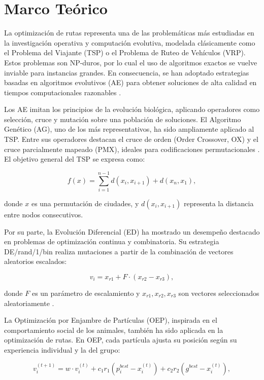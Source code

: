 \documentclass[conference]{IEEEtran}
\begin{document}
\section{Marco Teórico}

La optimización de rutas representa una de las problemáticas más estudiadas en la investigación operativa y computación evolutiva, modelada clásicamente como el Problema del Viajante (TSP) o el Problema de Ruteo de Vehículos (VRP). Estos problemas son NP-duros, por lo cual el uso de algoritmos exactos se vuelve inviable para instancias grandes. En consecuencia, se han adoptado estrategias basadas en algoritmos evolutivos (AE) para obtener soluciones de alta calidad en tiempos computacionales razonables \cite{eiben2003}.

Los AE imitan los principios de la evolución biológica, aplicando operadores como selección, cruce y mutación sobre una población de soluciones. El Algoritmo Genético (AG), uno de los más representativos, ha sido ampliamente aplicado al TSP. Entre sus operadores destacan el cruce de orden (Order Crossover, OX) y el cruce parcialmente mapeado (PMX), ideales para codificaciones permutacionales \cite{syswerda1989}. El objetivo general del TSP se expresa como:

\begin{equation}
f(x) = \sum_{i=1}^{n-1} d(x_i, x_{i+1}) + d(x_n, x_1),
\end{equation}

donde $x$ es una permutación de ciudades, y $d(x_i, x_{i+1})$ representa la distancia entre nodos consecutivos.

Por su parte, la Evolución Diferencial (ED) ha mostrado un desempeño destacado en problemas de optimización continua y combinatoria. Su estrategia DE/rand/1/bin realiza mutaciones a partir de la combinación de vectores aleatorios escalados:

\begin{equation}
v_i = x_{r1} + F \cdot (x_{r2} - x_{r3}),
\end{equation}

donde $F$ es un parámetro de escalamiento y $x_{r1}, x_{r2}, x_{r3}$ son vectores seleccionados aleatoriamente \cite{das2011}.

La Optimización por Enjambre de Partículas (OEP), inspirada en el comportamiento social de los animales, también ha sido aplicada en la optimización de rutas. En OEP, cada partícula ajusta su posición según su experiencia individual y la del grupo:

\begin{equation}
v_i^{(t+1)} = w \cdot v_i^{(t)} + c_1 r_1 (p_i^{best} - x_i^{(t)}) + c_2 r_2 (g^{best} - x_i^{(t)}),
\end{equation}
\end{document}
